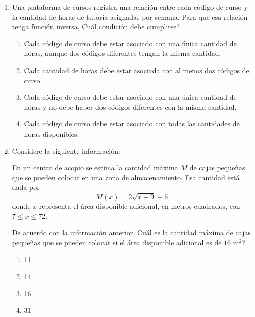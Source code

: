 \documentclass[12pt]{article}
\begin{document}
\begin{enumerate}[label=\textbf{\arabic*.}, itemsep=2.5cm]
\begin{enumerate}[label=\Alph*)]
  \item $[4,14]$
  \item $[17,82]$
  \item $[32,82]$
  \item $[32,70]$
\end{enumerate}

\Needspace{0.58\textheight}
\item
Una plataforma de cursos registra una relaci\'on entre cada c\'odigo de curso y la cantidad de horas de tutor\'ia asignadas por semana. Para que esa relaci\'on tenga funci\'on inversa, \textquestiondown Cu\'al condici\'on debe cumplirse?

\begin{enumerate}[label=\Alph*)]
  \item Cada c\'odigo de curso debe estar asociado con una \'unica cantidad de horas, aunque dos c\'odigos diferentes tengan la misma cantidad.
  \item Cada cantidad de horas debe estar asociada con al menos dos c\'odigos de curso.
  \item Cada c\'odigo de curso debe estar asociado con una \'unica cantidad de horas y no debe haber dos c\'odigos diferentes con la misma cantidad.
  \item Cada c\'odigo de curso debe estar asociado con todas las cantidades de horas disponibles.
\end{enumerate}

\Needspace{0.58\textheight}
\item
Considere la siguiente informaci\'on:

En un centro de acopio se estima la cantidad m\'axima $M$ de cajas peque\~nas que se pueden colocar en una zona de almacenamiento. Esa cantidad est\'a dada por
\[
M(x)=2\sqrt{x+9}+6,
\]
donde $x$ representa el \'area disponible adicional, en metros cuadrados, con $7 \leq x \leq 72$.

De acuerdo con la informaci\'on anterior, \textquestiondown Cu\'al es la cantidad m\'axima de cajas peque\~nas que se pueden colocar si el \'area disponible adicional es de $16\text{ m}^2$?

\begin{enumerate}[label=\Alph*)]
  \item 11
  \item 14
  \item 16
  \item 31
\end{enumerate}


\end{enumerate}
\end{document}
